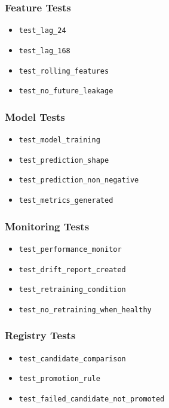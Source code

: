 \documentclass[11pt,a4paper]{article}
\begin{document}
\subsubsection{Feature Tests}

\begin{itemize}
    \item \texttt{test\_lag\_24}
    \item \texttt{test\_lag\_168}
    \item \texttt{test\_rolling\_features}
    \item \texttt{test\_no\_future\_leakage}
\end{itemize}

\subsubsection{Model Tests}

\begin{itemize}
    \item \texttt{test\_model\_training}
    \item \texttt{test\_prediction\_shape}
    \item \texttt{test\_prediction\_non\_negative}
    \item \texttt{test\_metrics\_generated}
\end{itemize}

\subsubsection{Monitoring Tests}

\begin{itemize}
    \item \texttt{test\_performance\_monitor}
    \item \texttt{test\_drift\_report\_created}
    \item \texttt{test\_retraining\_condition}
    \item \texttt{test\_no\_retraining\_when\_healthy}
\end{itemize}

\subsubsection{Registry Tests}

\begin{itemize}
    \item \texttt{test\_candidate\_comparison}
    \item \texttt{test\_promotion\_rule}
    \item \texttt{test\_failed\_candidate\_not\_promoted}
\end{itemize}
\end{document}
